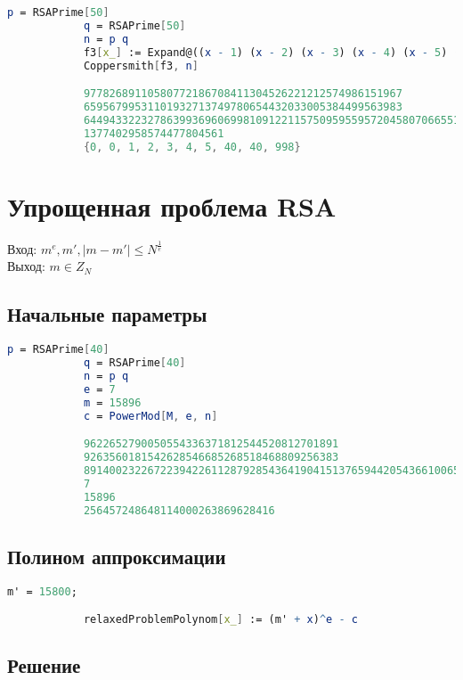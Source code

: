 	    	\begin{lstlisting}[language=Mathematica,caption={
	      		Пример	3
	    	}]
			p = RSAPrime[50]
			q = RSAPrime[50]
			n = p q
			f3[x_] := Expand@((x - 1) (x - 2) (x - 3) (x - 4) (x - 5) (x - 40) (x - 40) (x - 998) x)
			Coppersmith[f3, n]

			97782689110580772186708411304526221212574986151967
			65956799531101932713749780654432033005384499563983
			644943322327863993696069981091221157509595595720458070665516084380384623599211\
			1377402958574477804561
			{0, 0, 1, 2, 3, 4, 5, 40, 40, 998}
	    	\end{lstlisting}

	\section{Упрощенная проблема RSA}
		Вход: {$m^e, m', |m-m'| \le N^\frac{1}{e}$} \\   
  		Выход: {$m \in Z_N$}  

		\subsection{Начальные параметры}

			\begin{lstlisting}[language=Mathematica,caption={
	      		Начальные параметры
	    	}]
			p = RSAPrime[40]
			q = RSAPrime[40]
			n = p q
			e = 7
			m = 15896
			c = PowerMod[M, e, n]

			9622652790050554336371812544520812701891
			9263560181542628546685268518468809256383
			89140023226722394226112879285436419041513765944205436610065094651378340767920253
			7
			15896
			256457248648114000263869628416
	    	\end{lstlisting}

    	\subsection{Полином аппроксимации}

    		\begin{lstlisting}[language=Mathematica,caption={
	      		Полином аппроксимации
	    	}]
			m' = 15800;

			relaxedProblemPolynom[x_] := (m' + x)^e - c	
	    	\end{lstlisting}

    	\subsection{Решение}

